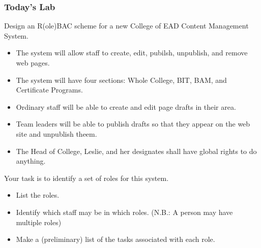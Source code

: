\documentclass[10pt]{beamer}
\begin{document}
\begin{frame}
  \frametitle{Today's Lab}

  Design an R(ole)BAC scheme for a new College of EAD Content Management System.
 \begin{itemize}
  \item The system will allow staff to create, edit, pubilsh, unpublish, and remove web pages.
  \item The system will have four sections:  Whole College, BIT, BAM, and Certificate Programs.
  \item Ordinary staff will be able to create and edit page drafts in their area.
  \item Team leaders will be able to publish drafts so that they appear on the web site and unpublish theem.
  \item The Head of College, Leslie, and her designates shall have global rights to do anything.
  \end{itemize}

Your task is to identify a set of roles for this system.
 \begin{itemize}
	 \item List the roles.
	 \item Identify which staff may be in which roles.  (N.B.: A person may have multiple roles)
	 \item Make a (preliminary) list of the tasks associated with each role.
  \end{itemize}

\end{frame}
\end{document}
